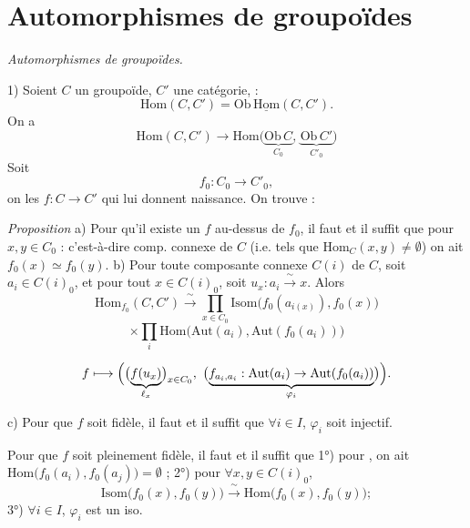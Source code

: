 \documentclass[11pt,a4paper]{article}
\begin{document}
\section{Automorphismes de groupoïdes}

\emph{Automorphismes de groupoïdes.}

1) Soient $C$ \struck{\ill{}} un groupoïde, $C'$ une catégorie, \ill{} \ill{} :
\[
  \mathrm{Hom}(C, C') = \mathrm{Ob}\, \underline{\mathrm{Hom}}(C, C').
\]
On a
\[
  \mathrm{Hom}(C, C') \longrightarrow \mathrm{Hom}\bigl(\underbrace{\mathrm{Ob}\,C}_{C_0},\, \underbrace{\mathrm{Ob}\,C'}_{C'_0}\bigr)
\]
Soit
\[
  f_0 : C_0 \to C'_0 ,
\]
on  les $f : C \to C'$ qui lui donnent naissance. On trouve :

\emph{Proposition} a) Pour qu'il existe un $f$ au-dessus de $f_0$, il faut et il suffit que pour $x, y \in C_0$  : c'est-à-dire  comp. connexe de $C$ (i.e. tels que $\mathrm{Hom}_C(x, y) \neq \emptyset$) on ait $f_0(x) \simeq f_0(y)$.
b) Pour toute composante connexe $C(i)$ de $C$, soit $a_i \in C(i)_0$, et pour tout $x \in C(i)_0$, soit
$u_x : a_i \xrightarrow{\ \sim\ } x$. Alors
\[
  \mathrm{Hom}_{f_0}(C, C') \xrightarrow{\ \sim\ }
  \prod_{x \in C_0} \mathrm{Isom}\bigl(f_0(a_{i(x)}), f_0(x)\bigr)
\]
\[
  \times \prod_{i} \mathrm{Hom}\bigl(\mathrm{Aut}(a_i), \mathrm{Aut}(f_0(a_i))\bigr)
\]

\[
  f \longmapsto \Bigl(\bigl(\underbrace{f(u_x)}_{\ell_x}\bigr)_{x \in C_0},\
  \bigl(\underbrace{f_{a_i, a_i} : \mathrm{Aut}(a_i) \to \mathrm{Aut}(f_0(a_i))}_{\varphi_i}\bigr)\Bigr).
\]

c) Pour que $f$ soit fidèle, il faut et il suffit que $\forall i \in I$, $\varphi_i$ soit injectif.

Pour que $f$ soit pleinement fidèle, il faut et il suffit que
1°) pour , on ait $\mathrm{Hom}\bigl(f_0(a_i), f_0(a_j)\bigr) = \emptyset$ ;
2°) pour $\forall x, y \in C(i)_0$,
\[
  \mathrm{Isom}\bigl(f_0(x), f_0(y)\bigr) \xrightarrow{\ \sim\ } \mathrm{Hom}\bigl(f_0(x), f_0(y)\bigr) ;
\]
3°) $\forall i \in I$, $\varphi_i$ est un iso.
\end{document}

